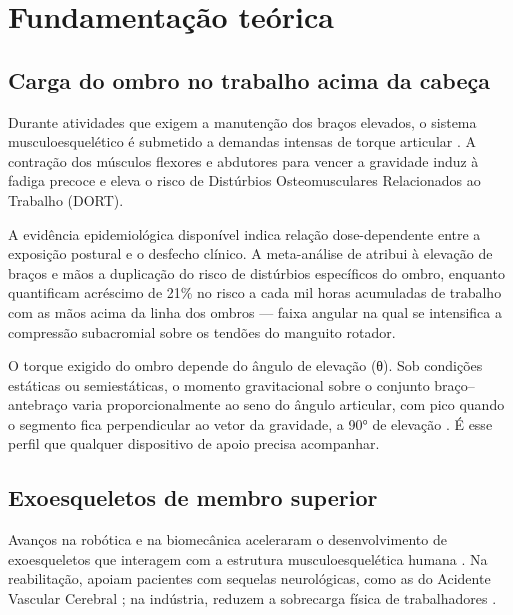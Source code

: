 
\chapter{Fundamentação teórica}\label{sec:2}

\section{Carga do ombro no trabalho acima da cabeça}\label{sec:2.1}

Durante atividades que exigem a manutenção dos braços elevados, o sistema musculoesquelético é submetido a demandas intensas de torque articular \cite{moeller2022,perry2007}. A contração dos músculos flexores e abdutores para vencer a gravidade induz à fadiga precoce e eleva o risco de Distúrbios Osteomusculares Relacionados ao Trabalho (DORT).

A evidência epidemiológica disponível indica relação dose-dependente entre a exposição postural e o desfecho clínico. A meta-análise de \textcite{vandermolen2017} atribui à elevação de braços e mãos a duplicação do risco de distúrbios específicos do ombro, enquanto \textcite{seidler2020} quantificam acréscimo de 21\% no risco a cada mil horas acumuladas de trabalho com as mãos acima da linha dos ombros — faixa angular na qual se intensifica a compressão subacromial sobre os tendões do manguito rotador.

O torque exigido do ombro depende do ângulo de elevação (θ). Sob condições estáticas ou semiestáticas, o momento gravitacional sobre o conjunto braço–antebraço varia proporcionalmente ao seno do ângulo articular, com pico quando o segmento fica perpendicular ao vetor da gravidade, a 90° de elevação \cite{grazi2020,palazzi2022}. É esse perfil que qualquer dispositivo de apoio precisa acompanhar.

\section{Exoesqueletos de membro superior}\label{sec:2.2}

Avanços na robótica e na biomecânica aceleraram o desenvolvimento de exoesqueletos que interagem com a estrutura musculoesquelética humana \cite{gull2020}. Na reabilitação, apoiam pacientes com sequelas neurológicas, como as do Acidente Vascular Cerebral \cite{barsotti2015,bouteraa2016,zeiaee2017}; na indústria, reduzem a sobrecarga física de trabalhadores \cite{moeller2022,spada2017}.

